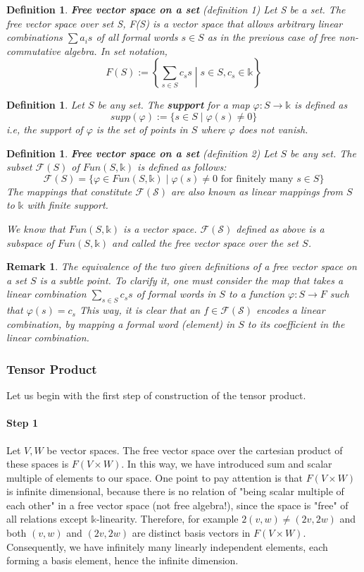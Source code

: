 \documentclass[12pt]{article}
\newtheorem{definition}[theorem]{Definition}
\newtheorem{remark}[theorem]{Remark}
\numberwithin{theorem}{section}
\numberwithin{equation}{theorem}
\newcommand{\kk}{\mathds{k}}
\begin{document}
\begin{definition}\textbf{Free vector space on a set} (definition 1)
    Let S be a set. The free vector space over set S, F(S) is a vector space that allows arbitrary linear combinations $\sum a_i s$ of all formal words $s \in S$ as in the previous case of free non-commutative algebra. In set notation,
    $$F(S) := \left\{\sum_{s \in S} c_s s \middle | s \in S, c_s \in \kk\right\}$$
\end{definition}
\begin{definition}
    Let $S$ be any set. The \textbf{support} for a map $\varphi : S \to \kk$ is defined as $$supp(\varphi) := \{ s \in S \mid \varphi(s) \neq 0 \}$$
    i.e, the support of $\varphi$ is the set of points in $S$ where $\varphi$ does not vanish.
\end{definition}
\begin{definition} \textbf{Free vector space on a set} (definition 2) 
    Let $S$ be any set. The subset $\mathcal{F}(S)$ of $Fun(S, \kk)$ is defined as follows:
    $$\mathcal{F}(S) = \{\varphi \in Fun(S, \kk) \mid \varphi(s) \neq 0 \text{ for finitely many } s \in S \}$$
    The mappings that constitute $\mathcal{F(S)}$ are also known as linear mappings from $S$ to $\kk$ with finite support.

    We know that $Fun(S, \kk)$ is a vector space. $\mathcal{F(S)}$ defined as above is a subspace of $Fun(S, \kk)$ and called the free vector space over the set $S$.
\end{definition}
\begin{remark}
    The equivalence of the two given definitions of a free vector space on a set $S$ is a subtle point. To clarify it, one must consider the map that takes a linear combination $\sum_{s \in S}c_s s$ of formal words in $S$ to a function $\varphi : S \to F$ such that $\varphi(s) = c_s$ This way, it is clear that an $f \in \mathcal{F(S)}$ encodes a linear combination, by mapping a formal word (element) in $S$ to its coefficient in the linear combination.
\end{remark}


\subsubsection{Tensor Product}
Let us begin with the first step of construction of the tensor product.

\paragraph{Step 1}
Let $V, W$ be vector spaces. The free vector space over the cartesian product of these spaces is $F(V \times W)$. In this way, we have introduced sum and scalar multiple of elements to our space.
One point to pay attention is that $F(V \times W)$ is infinite dimensional, because there is no relation of "being scalar multiple of each other" in a free vector space (not free algebra!), since the space is "free" of all relations except $\kk$-linearity. Therefore, for example $2(v, w) \neq (2v, 2w)$ and both $(v, w)$ and $(2v, 2w)$ are distinct basis vectors in $F(V \times W)$. Consequently, we have infinitely many linearly independent elements, each forming a basis element, hence the infinite dimension.
\end{document}
